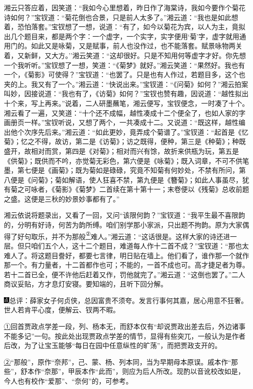 湘云只答应着，因笑道：``我如今心里想着，昨日作了海棠诗，我如今要作个菊花诗如何？''宝钗道：``菊花倒也合景，只是前人太多了。''湘云道：``我也是如此想着，恐怕落套。''宝钗想了一想，说道：``有了，如今以菊花为宾，以人为主，竟拟出几个题目来，都是两个字：一个虚字，一个实字，实字便用`菊'字，虚字就用通用门的。如此又是咏菊，又是赋事，前人也没作过，也不能落套。赋景咏物两关着，又新鲜，又大方。''湘云笑道：``这却很好。只是不知用何等虚字才好。你先想一个我听听。''宝钗想了一想，笑道：``《菊梦》就好。''湘云笑道：``果然好。我也有一个，《菊影》可使得？''宝钗道：``也罢了。只是也有人作过，若题目多，这个也夹的上。我又有了一个。''湘云道：``快说出来。''宝钗道：``《问菊》如何？''湘云拍案叫妙，因接说道：``我也有了，《访菊》如何？''宝钗也赞有趣，因说道：``越性拟出十个来，写上再来。''说着，二人研墨蘸笔，湘云便写，宝钗便念，一时凑了十个。湘云看了一遍，又笑道：``十个还不成幅，越性凑成十二个便全了，也如人家的字画册页一样。''宝钗听说，又想了两个，一共凑成十二。又说道：``既这样，越性编出他个次序先后来。''湘云道：``如此更妙，竟弄成个菊谱了。''宝钗道：``起首是《忆菊》；忆之不得，故访，第二是《访菊》；访之既得，便种，第三是《种菊》；种既盛开，故相对而赏，第四是《对菊》；相对而兴有馀，故折来供瓶为玩，第五是《供菊》；既供而不吟，亦觉菊无彩色，第六便是《咏菊》；既入词章，不可不供笔墨，第七便是《画菊》；既为菊如是碌碌，究竟不知菊有何妙处，不禁有所问，第八便是《问菊》；菊如解语，使人狂喜不禁，第九便是《簪菊》；如此人事虽尽，犹有菊之可咏者，《菊影》《菊梦》二首续在第十第十一；末卷便以《残菊》总收前题之盛。这便是三秋的妙景妙事都有了。''

湘云依说将题录出，又看了一回，又问``该限何韵？''宝钗道：``我平生最不喜限韵的，分明有好诗，何苦为韵所缚。咱们别学那小家派，只出题不拘韵。原为大家偶得了好句取乐，并不为那般\href{../Text/part0041_split_000.html\#lnkback_2_a}{\textsuperscript{②}}难人。''湘云道：``这话很是。这样大家的诗还进一层。但只咱们五个人，这十二个题目，难道每人作十二首不成？''宝钗道：``那也太难人了。将这题目誊好，都要七言律，明日贴在墙上。他们看了，谁作那一个就作那一个。有力量者，十二首都作也可；不能的，一首不成也可。高才捷足者为尊。若十二首已全，便不许他后赶着又作，罚他就完了。''湘云道：``这倒也罢了。''二人商议妥贴，方才息灯安寝。要知端的，且听下回分解。

{\includegraphics[width=3mm]{../Images/00005}总评：薛家女子何贞侠，总因富贵不须夸。发言行事何其嘉，居心用意不狂奢。世人若肯平心度，便解云、钗两不暇。}

{\href{../Text/part0041_split_000.html\#navto_1_a}{①}回首贾政点学差一段，列、杨本无，而舒本仅有``却说贾政出差去后，外边诸事不能多记''一句。按此处出现贾政点学差的情节，显得有些突兀，一般认为是作者后改，为了让宝玉能够``每日在园中任意纵性的旷荡''，而把贾政支开的。}

{\href{../Text/part0041_split_000.html\#navto_2_a}{②}``那般''，原作``奈邦''，己、蒙、杨、列本同，当为早期母本原误。戚本作``那些''，舒本作``奈那''，甲辰本作``此而''，则应为后人所改。现酌以音讹校改如是，今人也有校作``爱那''、``奈何''的，可参考。}
